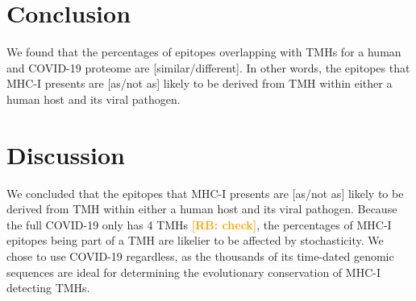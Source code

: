 \documentclass{article}
\newcommand{\richel}[1]{\textcolor{orange}{\textbf{[RB: #1]}}}
\begin{document}
\section{Conclusion}

We found that the percentages of epitopes overlapping 
with TMHs for a human and COVID-19 proteome are 
[similar/different]. In other words, the
epitopes that MHC-I presents are [as/not as] likely 
to be derived from TMH within either a human host and its viral pathogen.

\section{Discussion}

We concluded that the
epitopes that MHC-I presents are [as/not as] likely 
to be derived from TMH within either a human host and its viral pathogen.
Because the full COVID-19 only has 4 TMHs \richel{check}, the percentages
of MHC-I epitopes being part of a TMH are likelier to be affected by
stochasticity. We chose to use COVID-19 regardless, as the thousands
of its time-dated genomic sequences are ideal for determining the 
evolutionary conservation of MHC-I detecting TMHs. 

\end{document}
